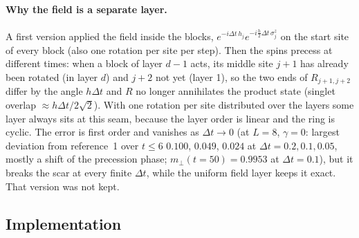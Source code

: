 \paragraph{Why the field is a separate layer.} A first version applied the field inside the blocks, $e^{-i\Delta t\, h_j}e^{-i\frac h2\Delta t\,\sigma^z_j}$ on the start site of every block (also one rotation per site per step). Then the spins precess at different times: when a block of layer $d - 1$ acts, its middle site $j + 1$ has already been rotated (in layer $d$) and $j + 2$ not yet (layer 1), so the two ends of $R_{j+1,j+2}$ differ by the angle $h\Delta t$ and $R$ no longer annihilates the product state (singlet overlap $\approx h\Delta t/2\sqrt2$). With one rotation per site distributed over the layers some layer always sits at this seam, because the layer order is linear and the ring is cyclic. The error is first order and vanishes as $\Delta t \to 0$ (at $L = 8$, $\gamma = 0$: largest deviation from reference~1 over $t \le 6$ $0.100$, $0.049$, $0.024$ at $\Delta t = 0.2, 0.1, 0.05$, mostly a shift of the precession phase; $m_\perp(t = 50) = 0.9953$ at $\Delta t = 0.1$), but it breaks the scar at every finite $\Delta t$, while the uniform field layer keeps it exact. That version was not kept.

\subsection{Implementation}
\label{sec:floquet-impl}

